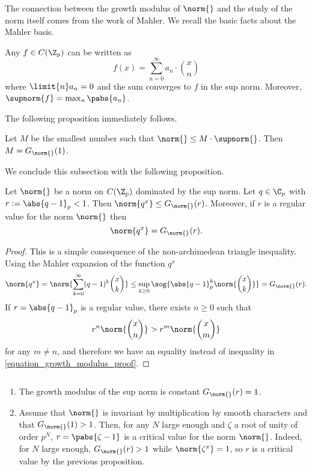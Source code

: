 The connection between the growth modulus of $\norm{}$ and the study of the norm itself comes from the work of Mahler.
We recall the basic facts about the Mahler basis.

\begin{thm}
Any $f\in C(\Z_p)$ can be written as 
\[f(x)=\sum_{n=0}^\infty a_n\cdot \binom{x}{n}\]
where $\limit{n}a_n=0$ and the sum converges to $f$ in the sup norm.
Moreover, $\supnorm{f}=\max_{n}\pabs{a_n}$.
\end{thm} 

The following proposition immediately follows.
\begin{prop}
Let $M$ be the smallest number such that $\norm{}\leq M\cdot \supnorm{}$.
Then $M=G_{\norm{}}(1)$.
\end{prop} 
We conclude this subsection with the following proposition.
\begin{prop}\label{powers_and_growth_modulus}
Let $\norm{}$ be a norm on $C(\Z_p)$ dominated by the sup norm.
Let $q\in \C_p $ with $r:=\abs{q-1}_p<1$.
Then $\norm{q^x}\leq G_{\norm{}}(r)$.
Moreover, if $r$ is a regular value for the norm $\norm{}$ then
\[\norm{q^x}=G_{\norm{}}(r).\]
\end{prop} 
    \begin{proof}
    This is a simple consequence of the non-archimedean triangle inequality.
    Using the Mahler expansion of the function $q^x$
        \begin{equation}\label{equation_growth_modulus_proof}
        \norm{q^x}=\norm{\sum_{k=0}^\infty(q-1)^k\binom{x}{k}}\leq \sup_{k \geq 0} \sog{\abs{q-1}_p^k\norm{\binom{x}{k}}}=G_{\norm{}}(r).  
        \end{equation} 
    If $r=\abs{q-1}_p$ is a regular value, there exists $n\geq 0$ such that 
    \[r^n\norm{\binom{x}{n}}>r^m\norm{\binom{x}{m}}\]
    for any $m\neq n$, and therefore we have an equality instead of inequality in \ref{equation_growth_modulus_proof}.
    \end{proof}
    \begin{exmp}
    $\ $
        \begin{enumerate}
        \item The growth modulus of the sup norm is constant $G_{\norm{}}(r)=1$.
        \item Assume that $\norm{}$ is invariant by multiplication by smooth characters and that $G_{\norm{}}(1)>1$.
        Then, for any $N$ large enough and $\zeta$ a root of unity of order $p^N$, $r=\pabs{\zeta-1}$ is a critical value for the norm $\norm{}$.
        Indeed, for $N$ large enough, $G_{\norm{}}(r)>1$ while $\norm{\zeta^x}=1$, so $r$ is a critical value by the previous proposition.
        \end{enumerate}
    \end{exmp} 


